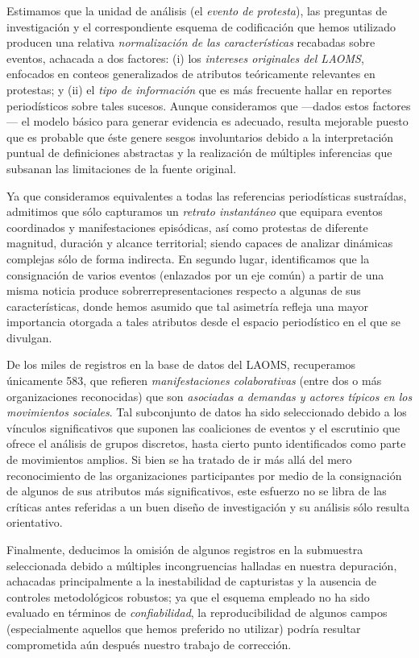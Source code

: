 \documentclass[letterpaper, 11pt]{book}
\theoremstyle{definition}
\theoremstyle{remark}
\begin{document}
Estimamos que la unidad de análisis (el \emph{evento de protesta}), las preguntas de investigación y el correspondiente esquema de codificación que hemos utilizado producen una relativa \emph{normalización de las características} recabadas sobre eventos, achacada a dos factores: 
(i) los \emph{intereses originales del LAOMS}, enfocados en conteos generalizados de atributos teóricamente relevantes en protestas; 
y (ii) el \emph{tipo de información} que es más frecuente hallar en reportes periodísticos sobre tales sucesos. 
Aunque consideramos que ---dados estos factores--- el modelo básico para generar evidencia es adecuado, resulta mejorable puesto que es probable que éste genere sesgos involuntarios debido a la interpretación puntual de definiciones abstractas y la realización de múltiples inferencias que subsanan las limitaciones de la fuente original. 


Ya que consideramos equivalentes a todas las referencias periodísticas sustraídas, admitimos que sólo capturamos un \emph{retrato instantáneo} que equipara eventos coordinados y manifestaciones episódicas, así como protestas de diferente magnitud, duración y alcance territorial; siendo capaces de analizar dinámicas complejas sólo de forma indirecta. 
En segundo lugar, identificamos que la consignación de varios eventos (enlazados por un eje común) a partir de una misma noticia produce sobrerrepresentaciones respecto a algunas de sus características, donde hemos asumido que tal asimetría refleja una mayor importancia otorgada a tales atributos desde el espacio periodístico en el que se divulgan. 


De los miles de registros en la base de datos del LAOMS, recuperamos únicamente 583, que refieren \emph{manifestaciones colaborativas} (entre dos o más organizaciones reconocidas) que son \emph{asociadas a demandas y actores típicos en los movimientos sociales}. 
Tal subconjunto de datos ha sido seleccionado debido a los vínculos significativos que suponen las coaliciones de eventos y el escrutinio que ofrece el análisis de grupos discretos, hasta cierto punto identificados como parte de movimientos amplios. 
Si bien se ha tratado de ir más allá del mero reconocimiento de las organizaciones participantes por medio de la consignación de algunos de sus atributos más significativos, este esfuerzo no se libra de las críticas antes referidas a un buen diseño de investigación y su análisis sólo resulta orientativo. 


Finalmente, deducimos la omisión de algunos registros en la submuestra seleccionada debido a múltiples incongruencias halladas en nuestra depuración, achacadas principalmente a la inestabilidad de capturistas y la ausencia de controles metodológicos robustos; ya que el esquema empleado no ha sido evaluado en términos de \emph{confiabilidad}, la reproducibilidad de algunos campos (especialmente aquellos que hemos preferido no utilizar) podría resultar comprometida aún después nuestro trabajo de corrección. 
\end{document}
